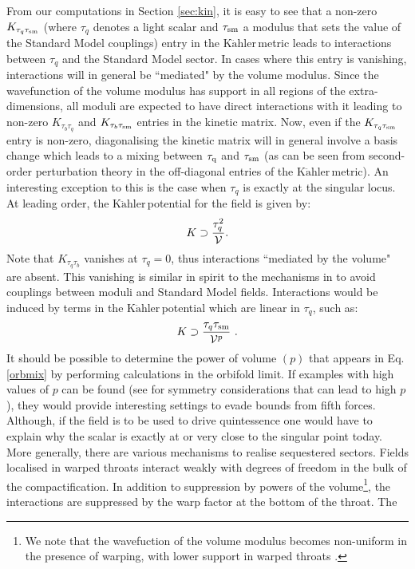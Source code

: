 \documentclass[11pt,a4paper]{article}
\newcommand{\V}{\mathcal{V}}
\newcommand{\Kahler}{\ensuremath{\text{K}\ddot{\text{a}}\text{hler}\,}}
\begin{document}
From our computations in Section \ref{sec:kin}, it is easy to see that a non-zero $K_{\tau_q \tau_{\rm sm}}$ (where $\tau_q$ denotes a light scalar and $\tau_{\rm sm}$ a modulus that sets the value of the Standard Model couplings) entry in the \Kahler metric leads to
interactions between $\tau_q$ and the Standard Model sector. In cases where  this entry is vanishing, interactions will in general  be ``mediated" by the volume modulus. Since the wavefunction of the  volume modulus has support in all regions of the extra-dimensions, all moduli are expected to have direct interactions with it leading to non-zero  $K_{\tau_b \tau_{q}}$ and $K_{\tau_b \tau_{\rm sm}}$ entries in the kinetic matrix. Now, even if the $K_{\tau_q \tau_{\rm sm}}$ entry is non-zero, diagonalising the kinetic matrix will in general involve a basis change which leads to a mixing between $\tau_{\rm q}$ and $\tau_{\rm sm}$ (as can be seen from second-order perturbation theory in the off-diagonal entries of the \Kahler metric). An interesting exception to this is the case when $\tau_q$ is
exactly at the singular locus. At leading order, the \Kahler potential for the field is given by:
%
\begin{equation}
\label{singk}
   K \supset { \tau_q^2 \over \V }.
\end{equation}
%
Note that $K_{\tau_q \tau_b}$ vanishes at $\tau_q = 0$, thus interactions ``mediated by the volume" are absent. This
vanishing is similar in spirit to the mechanisms in \cite{Damour:1994ya, Damour:2002mi, Brax:2009kd} to avoid couplings between moduli and Standard Model fields. Interactions would be induced by terms in the \Kahler potential which are linear in $\tau_q$, such as:
%
\begin{equation}
\label{orbmix}
   K \supset {\tau_q \tau_{\rm sm}  \over \V^{p}} \ .
\end{equation}
%
It should be possible to determine the power of volume $(p)$ that appears in Eq. \eqref{orbmix} by performing calculations in the orbifold limit. If examples with high values of $p$ can be found (see \cite{Kobayashi:2011cw, Maharana:2011wx} for symmetry considerations that can lead to high $p$), they would provide interesting settings to evade bounds from fifth forces. Although, if the field is to be used to drive quintessence one would have to explain why the scalar is  exactly at or very close to the singular point today. More generally, there are various mechanisms  to realise sequestered sectors. Fields localised in warped throats interact weakly with degrees of freedom in the bulk of the compactification. In addition to suppression by powers of the volume\footnote{We note that the wavefuction of the volume modulus becomes non-uniform in the presence of warping, with lower support in warped throats \cite{Giddings:2005ff, Frey:2006wv}.}, the interactions are suppressed by the warp factor at the bottom of the throat. The
\end{document}
